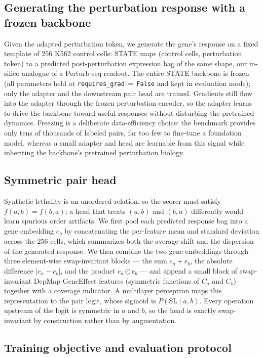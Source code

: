 \subsection{Generating the perturbation response with a frozen backbone}
\label{sec:generate}

Given the adapted perturbation token, we generate the gene's response on a fixed
template of $256$ K562 control cells: STATE maps (control cells, perturbation
token) to a predicted post-perturbation expression bag of the same shape, our
in-silico analogue of a Perturb-seq readout. The entire STATE backbone is frozen
(all parameters held at \texttt{requires\_grad}\,$=$\,\texttt{False} and kept in
evaluation mode); only the adapter and the downstream pair head are trained.
Gradients still flow into the adapter through the frozen perturbation encoder, so
the adapter learns to drive the backbone toward useful responses without
disturbing the pretrained dynamics. Freezing is a deliberate data-efficiency
choice: the benchmark provides only tens of thousands of labeled pairs, far too
few to fine-tune a foundation model, whereas a small adapter and head are
learnable from this signal while inheriting the backbone's pretrained
perturbation biology.

\subsection{Symmetric pair head}
\label{sec:pairhead}

Synthetic lethality is an unordered relation, so the scorer must satisfy
$f(a,b)=f(b,a)$; a head that treats $(a,b)$ and $(b,a)$ differently would learn
spurious order artifacts. We first pool each predicted response bag into a gene
embedding $e_g$ by concatenating the per-feature mean and standard deviation
across the $256$ cells, which summarizes both the average shift and the
dispersion of the generated response. We then combine the two gene embeddings
through three element-wise swap-invariant blocks --- the sum $e_a+e_b$, the
absolute difference $|e_a-e_b|$, and the product $e_a\odot e_b$ --- and append a
small block of swap-invariant DepMap GeneEffect features (symmetric functions of
$C_a$ and $C_b$) together with a coverage indicator. A multilayer perceptron maps
this representation to the pair logit, whose sigmoid is $P(\mathrm{SL}\mid a,b)$.
Every operation upstream of the logit is symmetric in $a$ and $b$, so the head is
exactly swap-invariant by construction rather than by augmentation.

\subsection{Training objective and evaluation protocol}
\label{sec:loss}

